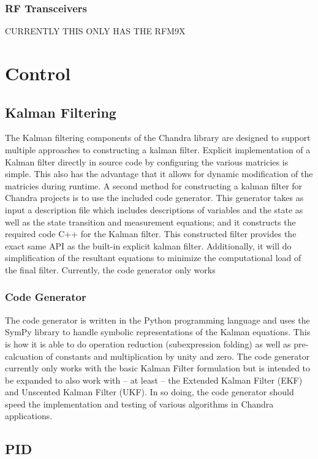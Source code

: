 \documentclass[10pt,letterpaper]{memoir} %
\begin{document}
\subsubsection{RF Transceivers}
CURRENTLY THIS ONLY HAS THE RFM9X

\section{Control}
\subsection{Kalman Filtering}
The Kalman filtering components of the Chandra library are designed to support multiple approaches to constructing a kalman filter.  Explicit implementation of a Kalman filter directly in source code by configuring the various matricies is simple.  This also has the advantage that it allows for dynamic modification of the matricies during runtime.  A second method for constructing a kalman filter for Chandra projects is to use the included code generator.  This generator takes as input a description file which includes descriptions of variables and the state as well as the state transition and measurement equations; and it constructs the required code C++ for the Kalman filter.  This constructed filter provides the exact same API as the built-in explicit kalman filter.  Additionally, it will do simplification of the resultant equations to minimize the computational load of the final filter.  Currently, the code generator only works 

\subsubsection{Code Generator}
The code generator is written in the Python programming language and uses the SymPy library to handle symbolic representations of the Kalman equations.  This is how it is able to do operation reduction (subexpression folding) as well as pre-calcuation of constants and multiplication by unity and zero.  The code generator currently only works with the basic Kalman Filter formulation but is intended to be expanded to also work with -- at least -- the Extended Kalman Filter (EKF) and Unscented Kalman Filter (UKF).  In so doing, the code generator should speed the implementation and testing of various algorithms in Chandra applications.

\subsection{PID}
\end{document}
